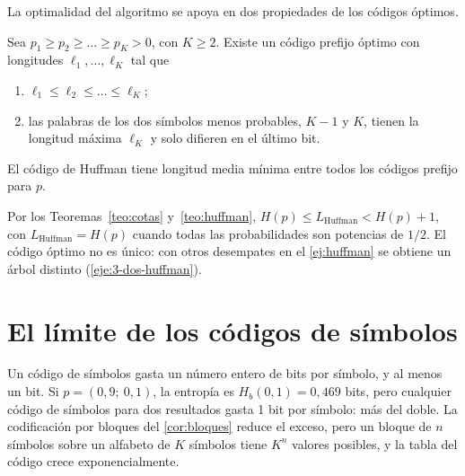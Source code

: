 \addtocounter{definicion}{1}%

\addtocounter{figure}{1}%

La optimalidad del algoritmo se apoya en dos propiedades de los códigos óptimos.

\begin{lema}\label{lem:optimo}
Sea $p_1\ge p_2\ge\dots\ge p_K>0$, con $K\ge 2$. Existe un código prefijo óptimo con longitudes $\ell_1,\dots,\ell_K$ tal que
\begin{enumerate}
  \item $\ell_1\le\ell_2\le\dots\le\ell_K$;
  \item las palabras de los dos símbolos menos probables, $K-1$ y $K$, tienen la longitud máxima $\ell_K$ y solo difieren en el último bit.
\end{enumerate}
\end{lema}

\begin{teorema}\label{teo:huffman}
El código de Huffman tiene longitud media mínima entre todos los códigos prefijo para $p$.
\end{teorema}

Por los Teoremas~\ref{teo:cotas} y~\ref{teo:huffman}, $H(p)\le L_{\text{Huffman}}<H(p)+1$, con $L_{\text{Huffman}}=H(p)$ cuando todas las probabilidades son potencias de $1/2$. El código óptimo no es único: con otros desempates en el \cref{ej:huffman} se obtiene un árbol distinto (\cref{eje:3-dos-huffman}).

\section{El límite de los códigos de símbolos}

Un código de símbolos gasta un número entero de bits por símbolo, y al menos un bit. Si $p=(0{,}9;\ 0{,}1)$, la entropía es $H_b(0{,}1)=0{,}469$ bits, pero cualquier código de símbolos para dos resultados gasta 1 bit por símbolo: más del doble. La codificación por bloques del \cref{cor:bloques} reduce el exceso, pero un bloque de $n$ símbolos sobre un alfabeto de $K$ símbolos tiene $K^{n}$ valores posibles, y la tabla del código crece exponencialmente.

\addtocounter{definicion}{1}%

